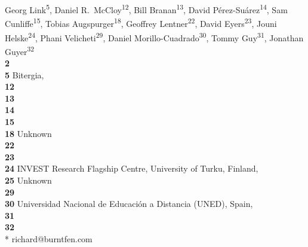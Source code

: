 Georg Link\textsuperscript{5},
Daniel R.\ McCloy\textsuperscript{12},
Bill Branan\textsuperscript{13},
David Pérez-Suárez\textsuperscript{14},
Sam Cunliffe\textsuperscript{15},
Tobias Augspurger\textsuperscript{18},
Geoffrey Lentner\textsuperscript{22}, %
David Eyers\textsuperscript{23}, %
Jouni Helske\textsuperscript{24},
Phani Velicheti\textsuperscript{29},
Daniel Morillo-Cuadrado\textsuperscript{30},
Tommy Guy\textsuperscript{31},
Jonathan Guyer\textsuperscript{32}
\\
\bigskip
\textbf{2} \\
\textbf{5} Bitergia, \\
\textbf{12} \\
\textbf{13} \\
\textbf{14} \\
\textbf{15} \\
\textbf{18} Unknown\\
\textbf{22} \\
\textbf{23} \\
\textbf{24} INVEST Research Flagship Centre, University of Turku, Finland, \\
\textbf{25} Unknown\\
\textbf{29} \\
\textbf{30} Universidad Nacional de Educación a Distancia (UNED), Spain, \\
\textbf{31} \\
\textbf{32} \\

* richard@burntfen.com
